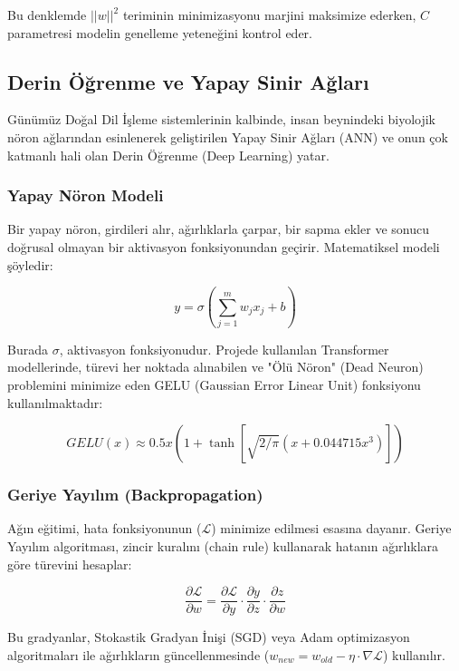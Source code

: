 \documentclass[12pt,a4paper]{report}
\begin{document}
Bu denklemde $||w||^2$ teriminin minimizasyonu marjini maksimize ederken, $C$ parametresi modelin genelleme yeteneğini kontrol eder.

\subsection{Derin Öğrenme ve Yapay Sinir Ağları}
Günümüz Doğal Dil İşleme sistemlerinin kalbinde, insan beynindeki biyolojik nöron ağlarından esinlenerek geliştirilen Yapay Sinir Ağları (ANN) ve onun çok katmanlı hali olan Derin Öğrenme (Deep Learning) yatar.

\subsubsection{Yapay Nöron Modeli}
Bir yapay nöron, girdileri alır, ağırlıklarla çarpar, bir sapma ekler ve sonucu doğrusal olmayan bir aktivasyon fonksiyonundan geçirir. Matematiksel modeli şöyledir:

\begin{equation}
    y = \sigma \left( \sum_{j=1}^{m} w_j x_j + b \right)
\end{equation}

Burada $\sigma$, aktivasyon fonksiyonudur. Projede kullanılan Transformer modellerinde, türevi her noktada alınabilen ve "Ölü Nöron" (Dead Neuron) problemini minimize eden GELU (Gaussian Error Linear Unit) fonksiyonu kullanılmaktadır:

\begin{equation}
    GELU(x) \approx 0.5x(1 + \tanh[\sqrt{2/\pi}(x + 0.044715x^3)])
\end{equation}

\subsubsection{Geriye Yayılım (Backpropagation)}
Ağın eğitimi, hata fonksiyonunun ($\mathcal{L}$) minimize edilmesi esasına dayanır. Geriye Yayılım algoritması, zincir kuralını (chain rule) kullanarak hatanın ağırlıklara göre türevini hesaplar:

\begin{equation}
    \frac{\partial \mathcal{L}}{\partial w} = \frac{\partial \mathcal{L}}{\partial y} \cdot \frac{\partial y}{\partial z} \cdot \frac{\partial z}{\partial w}
\end{equation}

Bu gradyanlar, Stokastik Gradyan İnişi (SGD) veya Adam optimizasyon algoritmaları ile ağırlıkların güncellenmesinde ($w_{new} = w_{old} - \eta \cdot \nabla \mathcal{L}$) kullanılır.
\end{document}
